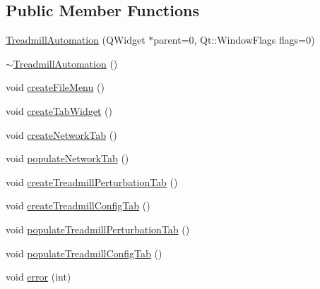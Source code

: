 \subsection*{Public Member Functions}
\begin{DoxyCompactItemize}
\item 
\hyperlink{class_treadmill_automation_a6328b65397f5d0553590f363d29ec9b7}{Treadmill\+Automation} (Q\+Widget $\ast$parent=0, Qt\+::\+Window\+Flags flags=0)
\item 
\hyperlink{class_treadmill_automation_a23106afb1a5f963e4155adce3ce888b0}{$\sim$\+Treadmill\+Automation} ()
\item 
void \hyperlink{class_treadmill_automation_abd35d06ba9806ec23cfcbb217eece9b2}{create\+File\+Menu} ()
\item 
void \hyperlink{class_treadmill_automation_abd813a9352232e33a223e530791c50f3}{create\+Tab\+Widget} ()
\item 
void \hyperlink{class_treadmill_automation_aeab5d20e81bca7654bace601c31b836c}{create\+Network\+Tab} ()
\item 
void \hyperlink{class_treadmill_automation_a05a1f1d52849b9c6ac7c277bd069bda0}{populate\+Network\+Tab} ()
\item 
void \hyperlink{class_treadmill_automation_afe4182a6c74b1cb88496f255727094db}{create\+Treadmill\+Perturbation\+Tab} ()
\item 
void \hyperlink{class_treadmill_automation_adacc698118c599e34ae1c532ee4c69d8}{create\+Treadmill\+Config\+Tab} ()
\item 
void \hyperlink{class_treadmill_automation_ad49662d53d5d7f5e797e55cb77a2e48f}{populate\+Treadmill\+Perturbation\+Tab} ()
\item 
void \hyperlink{class_treadmill_automation_ac9ab9327f0b8e6c1fdd039662128fdb9}{populate\+Treadmill\+Config\+Tab} ()
\item 
void \hyperlink{class_treadmill_automation_ac07500c11bc0801b84cfc7b0af137c5e}{error} (int)
\end{DoxyCompactItemize}
